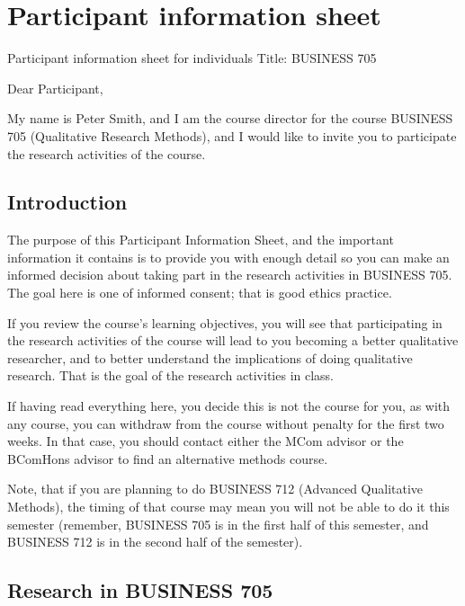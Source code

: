 \documentclass[]{book}
\theoremstyle{definition}
\theoremstyle{definition}
\theoremstyle{definition}
\theoremstyle{remark}
\begin{document}
\hypertarget{pis}{%
\chapter{Participant information sheet}\label{pis}}

Participant information sheet for individuals Title: BUSINESS 705

Dear Participant,

My name is Peter Smith, and I am the course director for the course
BUSINESS 705 (Qualitative Research Methods), and I would like to invite
you to participate the research activities of the course.

\hypertarget{introduction}{%
\section{Introduction}\label{introduction}}

The purpose of this Participant Information Sheet, and the important
information it contains is to provide you with enough detail so you can
make an informed decision about taking part in the research activities
in BUSINESS 705. The goal here is one of informed consent; that is good
ethics practice.

If you review the course's learning objectives, you will see that
participating in the research activities of the course will lead to you
becoming a better qualitative researcher, and to better understand the
implications of doing qualitative research. That is the goal of the
research activities in class.

If having read everything here, you decide this is not the course for
you, as with any course, you can withdraw from the course without
penalty for the first two weeks. In that case, you should contact either
the MCom advisor or the BComHons advisor to find an alternative methods
course.

Note, that if you are planning to do BUSINESS 712 (Advanced Qualitative
Methods), the timing of that course may mean you will not be able to do
it this semester (remember, BUSINESS 705 is in the first half of this
semester, and BUSINESS 712 is in the second half of the semester).

\hypertarget{research-in-business-705}{%
\section{Research in BUSINESS 705}\label{research-in-business-705}}
\end{document}
